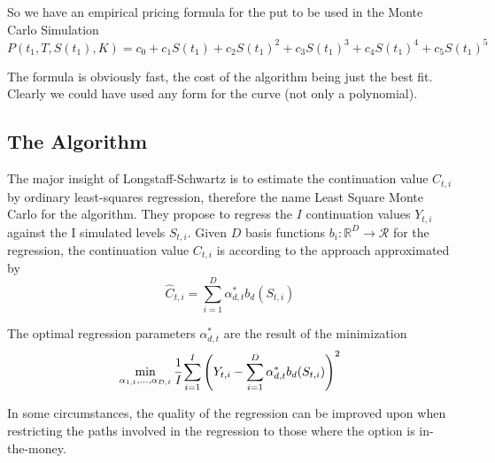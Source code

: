 \documentclass[12pt,a4paper]{article}
\begin{document}
So we have an empirical pricing formula for the put to be used in the Monte Carlo Simulation
\begin{equation}
	P(t_1,T,S(t_1),K)=c_0+c_1 S(t_1) + c_2 S(t_1)^2 + c_3 S(t_1)^3 + c_4 S(t_1)^4 + c_5 S(t_1)^5
\end{equation}

The formula is obviously fast, the cost of the algorithm being just the best fit. Clearly we could have used any form for the curve (not only a polynomial). 

\subsection{The Algorithm}
The major insight of Longstaff-Schwartz is to estimate the continuation value $C_{t,i}$ by ordinary least-squares regression, therefore the name Least Square Monte Carlo for the algorithm. 
They propose to regress the $I$ continuation values $Y_{t,i}$ against the I simulated levels $S_{t,i}$. Given $D$ basis functions $b_i:\mathbb{R}^D\rightarrow\mathcal{R}$ for the regression, the continuation value $C_{t,i}$ is according to the approach approximated by
\begin{equation}
	\hat{C}_{t,i}=\sum_{i=1}^D \alpha^*_{d,t}b_d(S_{t,i})
	\label{eq:continuation_approx}
\end{equation}

The optimal regression parameters $\alpha^*_{d,t}$ are the result of the minimization
\begin{equation}
	\min_{\alpha_{1,t},\ldots,\alpha_{D,t}}\cfrac{1}{I}\sum_{i=1}^I \left(Y_{t,i}-\sum_{i=1}^D\alpha^*_{d,t}b_d(S_{t,i})\right)^2
	\label{eq:optimization_alphas}	
\end{equation}

In some circumstances, the quality of the regression can be improved upon when restricting the paths involved in the regression to those where the option is in-the-money.
\end{document}
